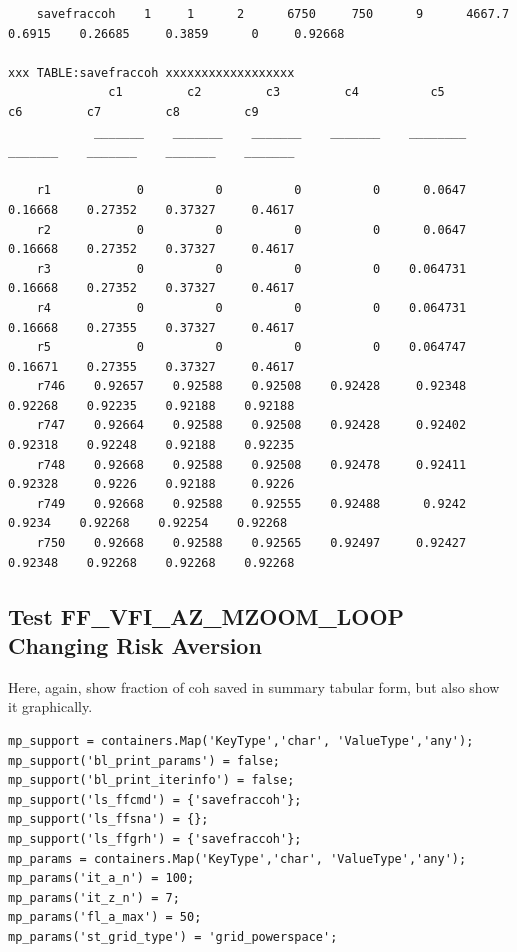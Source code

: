 \documentclass[
]{book}
\begin{document}
\begin{verbatim}
    savefraccoh    1     1      2      6750     750      9      4667.7    0.6915    0.26685     0.3859      0     0.92668

xxx TABLE:savefraccoh xxxxxxxxxxxxxxxxxx
              c1         c2         c3         c4          c5         c6         c7         c8         c9   
            _______    _______    _______    _______    ________    _______    _______    _______    _______

    r1            0          0          0          0      0.0647    0.16668    0.27352    0.37327     0.4617
    r2            0          0          0          0      0.0647    0.16668    0.27352    0.37327     0.4617
    r3            0          0          0          0    0.064731    0.16668    0.27352    0.37327     0.4617
    r4            0          0          0          0    0.064731    0.16668    0.27355    0.37327     0.4617
    r5            0          0          0          0    0.064747    0.16671    0.27355    0.37327     0.4617
    r746    0.92657    0.92588    0.92508    0.92428     0.92348    0.92268    0.92235    0.92188    0.92188
    r747    0.92664    0.92588    0.92508    0.92428     0.92402    0.92318    0.92248    0.92188    0.92235
    r748    0.92668    0.92588    0.92508    0.92478     0.92411    0.92328     0.9226    0.92188     0.9226
    r749    0.92668    0.92588    0.92555    0.92488      0.9242     0.9234    0.92268    0.92254    0.92268
    r750    0.92668    0.92588    0.92565    0.92497     0.92427    0.92348    0.92268    0.92268    0.92268
\end{verbatim}

\hypertarget{test-ff_vfi_az_mzoom_loop-changing-risk-aversion}{%
\subsection{Test FF\_VFI\_AZ\_MZOOM\_LOOP Changing Risk Aversion}\label{test-ff_vfi_az_mzoom_loop-changing-risk-aversion}}

Here, again, show fraction of coh saved in summary tabular form, but
also show it graphically.

\begin{verbatim}
mp_support = containers.Map('KeyType','char', 'ValueType','any');
mp_support('bl_print_params') = false;
mp_support('bl_print_iterinfo') = false;
mp_support('ls_ffcmd') = {'savefraccoh'};
mp_support('ls_ffsna') = {};
mp_support('ls_ffgrh') = {'savefraccoh'};
mp_params = containers.Map('KeyType','char', 'ValueType','any');
mp_params('it_a_n') = 100;
mp_params('it_z_n') = 7;
mp_params('fl_a_max') = 50;
mp_params('st_grid_type') = 'grid_powerspace';
\end{verbatim}
\end{document}
